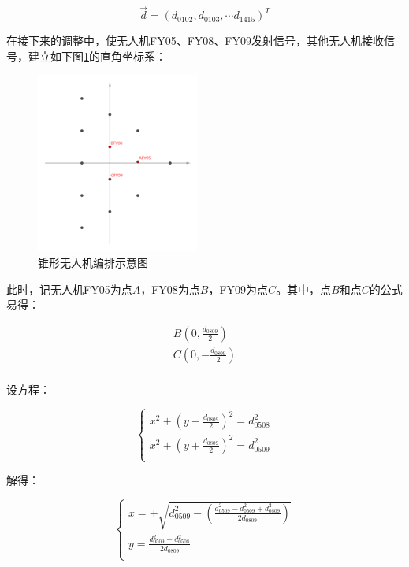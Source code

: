 \begin{equation}
    \overrightarrow{d} = (d_{0102}, d_{0103}, \cdots d_{1415})^T
\end{equation}

在接下来的调整中，使无人机FY05、FY08、FY09发射信号，其他无人机接收信号，建立如下图\ref{figure112051}的直角坐标系：

\begin{figure}
    \centering
    \includegraphics[scale=0.8]{res/figure112051.png}
    \caption{锥形无人机编排示意图}
    \label{figure112051}
\end{figure}

此时，记无人机FY05为点$A$，FY08为点$B$，FY09为点$C$。其中，点$B$和点$C$的公式易得：

\begin{equation}
    \begin{aligned}
        B(0, \frac{d_{0809}}{2})    \\
        C(0, -\frac{d_{0809}}{2})   \\
    \end{aligned}
\end{equation}

设方程：

\begin{equation}
    \begin{cases}
        x^2 + (y - \frac{d_{0809}}{2})^2 = d_{0508}^2 \\
        x^2 + (y + \frac{d_{0809}}{2})^2 = d_{0509}^2 \\
    \end{cases}
\end{equation}

解得：

\begin{equation}
    \begin{cases}
        x = \pm \sqrt{d_{0509}^2 - \left(\frac{d_{0509}^2 - d_{0509}^2 + d_{0809}^2}{2d_{0809}}\right)} \\
        y = \frac{d_{0509}^2 - d_{0508}^2}{2d_{0809}}   \\
    \end{cases}
\end{equation}

